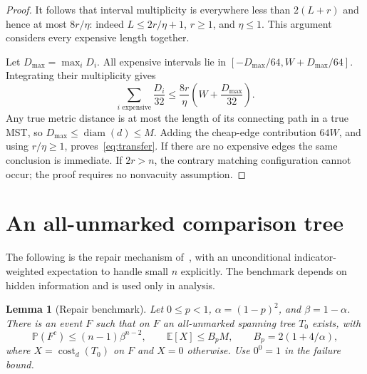 \documentclass[acmlarge,screen,nonacm,11pt]{acmart}
\newtheorem{lemma}[theorem]{Lemma}
\newcommand{\cost}{\operatorname{cost}}
\newcommand{\E}{\mathbb{E}}
\newcommand{\Prb}{\mathbb{P}}
\begin{document}
\begin{proof}
It follows that interval multiplicity is everywhere less than $2(L+r)$ and hence at most $8r/\eta$: indeed $L\leq2r/\eta+1$, $r\geq1$, and $\eta\leq1$. This argument considers every expensive length together.

Let $D_{\max}=\max_i D_i$. All expensive intervals lie in
$[-D_{\max}/64,W+D_{\max}/64]$. Integrating their multiplicity gives
\[
 \sum_{i\text{ expensive}}\frac{D_i}{32}
 \leq\frac{8r}{\eta}\left(W+\frac{D_{\max}}{32}\right).
\]
Any true metric distance is at most the length of its connecting path in a true MST, so $D_{\max}\leq\operatorname{diam}(d)\leq M$. Adding the cheap-edge contribution $64W$, and using $r/\eta\geq1$, proves~\eqref{eq:transfer}. If there are no expensive edges the same conclusion is immediate. If $2r>n$, the contrary matching configuration cannot occur; the proof requires no nonvacuity assumption.
\end{proof}

\section{An all-unmarked comparison tree}\label{sec:repair}
The following is the repair mechanism of~\cite[Lemma~3.2]{AGJLV26}, with an unconditional indicator-weighted expectation to handle small $n$ explicitly. The benchmark depends on hidden information and is used only in analysis.

\begin{lemma}[Repair benchmark]\label{lem:repair}
Let $0\leq p<1$, $\alpha=(1-p)^2$, and $\beta=1-\alpha$. There is an event $F$ such that on $F$ an all-unmarked spanning tree $T_0$ exists, with
\begin{equation}\label{eq:repair}
 \Prb(F^c)\leq(n-1)\beta^{n-2},\qquad
 \E[X]\leq B_pM,\qquad B_p=2(1+4/\alpha),
\end{equation}
where $X=\cost_d(T_0)$ on $F$ and $X=0$ otherwise. Use $0^0=1$ in the failure bound.
\end{lemma}
\end{document}
